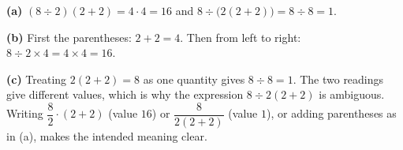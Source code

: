 \textbf{(a)} $(8\div2)(2+2)=4\cdot4=\boxed{16}$ and $8\div\bigl(2(2+2)\bigr)=8\div8=\boxed{1}$.

\textbf{(b)} First the parentheses: $2+2=4$. Then from left to right: $8\div2\times4=4\times4=\boxed{16}$.

\textbf{(c)} Treating $2(2+2)=8$ as one quantity gives $8\div8=\boxed{1}$. The two readings give different values, which is why the expression $8\div2(2+2)$ is ambiguous. Writing $\dfrac82\cdot(2+2)$ (value $16$) or $\dfrac{8}{2(2+2)}$ (value $1$), or adding parentheses as in (a), makes the intended meaning clear.
